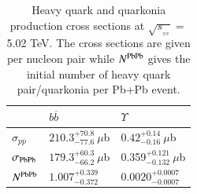 %
%




\begin{table}
  \begin{center}
\caption[]{Heavy quark and quarkonia production  cross sections at
$\sqrt{s_{_{_{NN}}}}=$ 5.02 TeV. The cross sections are given per nucleon pair while
$N^{\rm PbPb}$ gives the initial number of heavy quark pair/quarkonia per Pb+Pb event.}
\label{NLOcros}
\begin{tabular}{l|l|l} 
\hline 
\hline
                        & $ b \overline b$                    & $\Upsilon$   \\              
\hline
$\sigma_{pp}$            & $210.3^{+70.8}_{-77.6}~\mu$b            & $0.42^{+0.14}_{-0.16}~\mu$b  \\


$\sigma_{\rm PbPb}$        & $179.3^{+60.3}_{-66.2}~\mu$b             & 0.359$^{+0.121}_{-0.132}~\mu$b  \\



$N^{\rm PbPb}$              & $1.007^{+0.339}_{-0.372}$               & $0.0020^{+0.0007}_{-0.0007}$   \\

\hline
\hline
\end{tabular}
\end{center}
\end{table}




















